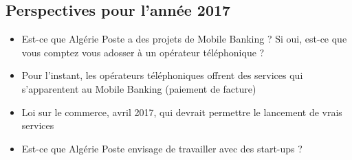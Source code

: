 \documentclass{report}
\begin{document}
\subsection{Perspectives pour l'année 2017}
\begin{itemize}
\item Est-ce que Algérie Poste a des projets de Mobile Banking ? Si oui, est-ce que vous comptez vous adosser à un opérateur téléphonique ?
\item Pour l'instant, les opérateurs téléphoniques offrent des services qui s'apparentent au Mobile Banking (paiement de facture)
\item Loi sur le commerce, avril 2017, qui devrait permettre le lancement de vrais services
\item Est-ce que Algérie Poste envisage de travailler avec des start-ups ?
\end{itemize}
\end{document}
